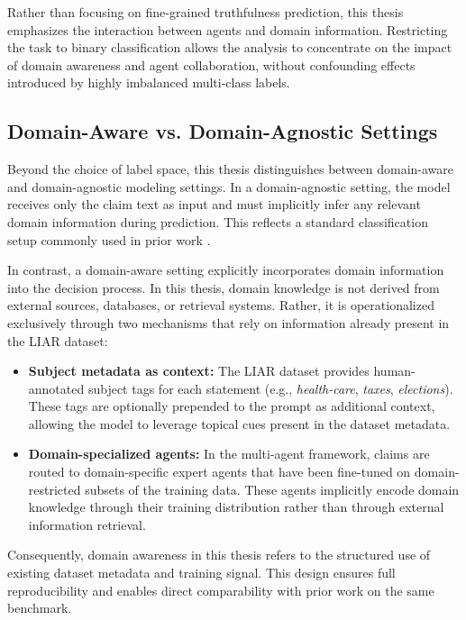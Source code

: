Rather than focusing on fine-grained truthfulness prediction, this thesis emphasizes the interaction between agents and domain information. Restricting the task to binary classification allows the analysis to concentrate on the impact of domain awareness and agent collaboration, without confounding effects introduced by highly imbalanced multi-class labels.

\subsection{Domain-Aware vs. Domain-Agnostic Settings}

Beyond the choice of label space, this thesis distinguishes between domain-aware and domain-agnostic modeling settings. In a domain-agnostic setting, the model receives only the claim text as input and must implicitly infer any relevant domain information during prediction. This reflects a standard classification setup commonly used in prior work \cite{schulhoff2025promptreportsystematicsurvey}.

In contrast, a domain-aware setting explicitly incorporates domain information into the decision process. In this thesis, domain knowledge is not derived from external sources, databases, or retrieval systems. Rather, it is operationalized exclusively through two mechanisms that rely on information already present in the LIAR dataset:

\begin{itemize}
    \item \textbf{Subject metadata as context:} The LIAR dataset provides 
    human-annotated subject tags for each statement (e.g., 
    \textit{health-care}, \textit{taxes}, \textit{elections}). These tags 
    are optionally prepended to the prompt as additional context, allowing 
    the model to leverage topical cues present in the dataset metadata.
    
    \item \textbf{Domain-specialized agents:} In the multi-agent framework, 
    claims are routed to domain-specific expert agents that have been 
    fine-tuned on domain-restricted subsets of the training data. These 
    agents implicitly encode domain knowledge through their training 
    distribution rather than through external information retrieval.
\end{itemize}

Consequently, domain awareness in this thesis refers to the structured use of existing dataset metadata and training signal. This design ensures full reproducibility and enables direct comparability with prior work on the same benchmark.

